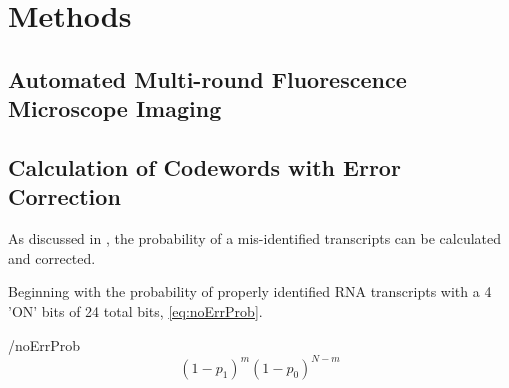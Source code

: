 \documentclass[Endo]{subfiles}
\begin{document}
\renewcommand{\figName}{TonsilB2M}
\renewcommand{\figFile}{\figName}
\hypertarget{\figFile}{}


\hypertarget{Methods}{}
\section{Methods}\label{sec:methods}


\hypertarget{Automated-Multiround-Fluorescence-Microscope-Imaging}{}
\subsection{Automated Multi-round Fluorescence Microscope Imaging}\label{subsec:vsa}

\renewcommand{\figName}{VSA_control}
\renewcommand{\figFile}{\figName}
\hypertarget{\figFile}{}





\hypertarget{Calculation-of-Codewords-with-error-Correction}{}
\subsection{Calculation of Codewords with Error Correction}\label{subsec:error}
  

As discussed in \cite{Chen:2015}, the probability of a mis-identified transcripts can be calculated and corrected.

Beginning with the probability of properly identified RNA transcripts with a 4 'ON' bits of 24 total bits, \ref{eq:noErrProb}.

\begin{verbatimwrite}{\EqDir/noErrProb}
  \begin{equation}
    \left(1-p_1\right)^m\left(1-p_0\right)^{N-m}
    \label{eq:noErrProb}
  \end{equation}
\end{verbatimwrite}

\end{document}
